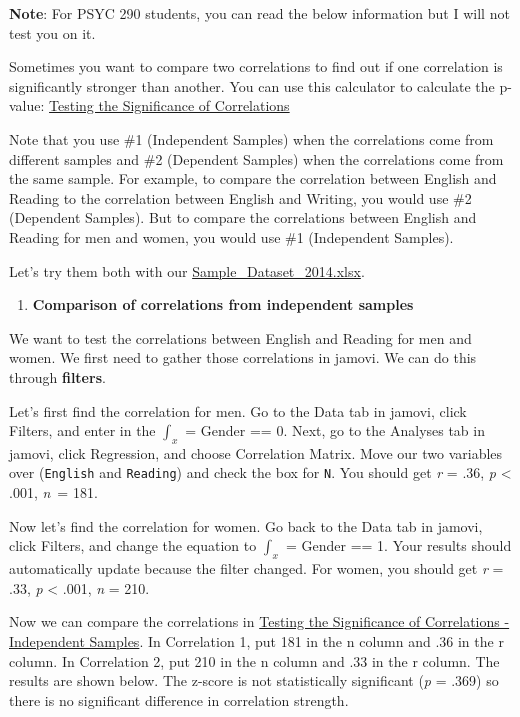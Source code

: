 \documentclass[
]{book}
\providecommand{\tightlist}{%
  \setlength{\itemsep}{0pt}\setlength{\parskip}{0pt}}
\begin{document}
\textbf{Note}: For PSYC 290 students, you can read the below information but I will not test you on it.

Sometimes you want to compare two correlations to find out if one correlation is significantly stronger than another. You can use this calculator to calculate the p-value: \href{https://www.psychometrica.de/correlation.html}{Testing the Significance of Correlations}

Note that you use \#1 (Independent Samples) when the correlations come from different samples and \#2 (Dependent Samples) when the correlations come from the same sample. For example, to compare the correlation between English and Reading to the correlation between English and Writing, you would use \#2 (Dependent Samples). But to compare the correlations between English and Reading for men and women, you would use \#1 (Independent Samples).

Let's try them both with our \href{https://github.com/danawanzer/stats-with-jamovi/blob/master/data/Sample_Dataset_2014.xlsx}{Sample\_Dataset\_2014.xlsx}.

\begin{enumerate}
\def\labelenumi{\arabic{enumi}.}
\tightlist
\item
  \textbf{Comparison of correlations from independent samples}
\end{enumerate}

We want to test the correlations between English and Reading for men and women. We first need to gather those correlations in jamovi. We can do this through \textbf{filters}.

Let's first find the correlation for men. Go to the Data tab in jamovi, click Filters, and enter in the \(\int_x\) = Gender == 0. Next, go to the Analyses tab in jamovi, click Regression, and choose Correlation Matrix. Move our two variables over (\texttt{English} and \texttt{Reading}) and check the box for \texttt{N}. You should get \emph{r} = .36, \emph{p} \textless{} .001, \emph{n}~= 181.

Now let's find the correlation for women. Go back to the Data tab in jamovi, click Filters, and change the equation to \(\int_x\) = Gender == 1. Your results should automatically update because the filter changed. For women, you should get \emph{r} = .33, \emph{p} \textless{} .001, \emph{n} = 210.

Now we can compare the correlations in \href{https://www.psychometrica.de/correlation.html\#independent}{Testing the Significance of Correlations - Independent Samples}. In Correlation 1, put 181 in the n column and .36 in the r column. In Correlation 2, put 210 in the n column and .33 in the r column. The results are shown below. The z-score is not statistically significant (\emph{p} = .369) so there is no significant difference in correlation strength.
\end{document}

